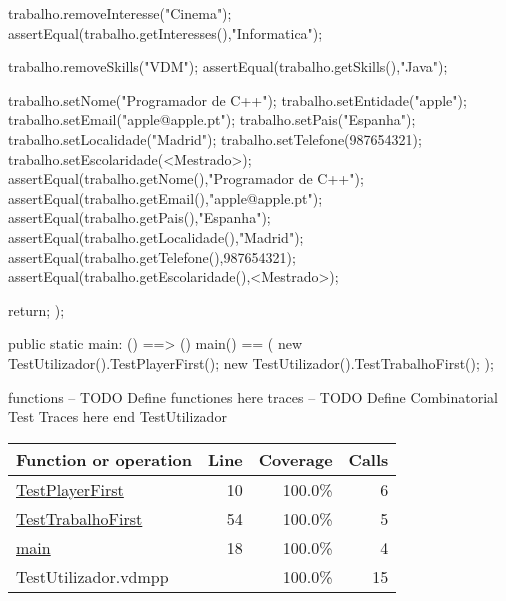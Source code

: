 \begin{vdmpp}[breaklines=true]
 trabalho.removeInteresse("Cinema");
 assertEqual(trabalho.getInteresses(),{"Informatica"});
 
 trabalho.removeSkills("VDM");
 assertEqual(trabalho.getSkills(),{"Java"});
 
 trabalho.setNome("Programador de C++");
 trabalho.setEntidade("apple");
 trabalho.setEmail("apple@apple.pt");
 trabalho.setPais("Espanha");
 trabalho.setLocalidade("Madrid");
 trabalho.setTelefone(987654321);
 trabalho.setEscolaridade(<Mestrado>);
 assertEqual(trabalho.getNome(),"Programador de C++");
 assertEqual(trabalho.getEmail(),"apple@apple.pt");
 assertEqual(trabalho.getPais(),"Espanha");
 assertEqual(trabalho.getLocalidade(),"Madrid");
 assertEqual(trabalho.getTelefone(),987654321);
 assertEqual(trabalho.getEscolaridade(),<Mestrado>);

 return;
);

public static main: () ==> ()
main() ==
(
   new TestUtilizador().TestPlayerFirst();
   new TestUtilizador().TestTrabalhoFirst();
);

functions
-- TODO Define functiones here
traces
-- TODO Define Combinatorial Test Traces here
end TestUtilizador
\end{vdmpp}
\bigskip
\begin{longtable}{|l|r|r|r|}
\hline
Function or operation & Line & Coverage & Calls \\
\hline
\hline
\hyperref[TestPlayerFirst:10]{TestPlayerFirst} & 10&100.0\% & 6 \\
\hline
\hyperref[TestTrabalhoFirst:54]{TestTrabalhoFirst} & 54&100.0\% & 5 \\
\hline
\hyperref[main:18]{main} & 18&100.0\% & 4 \\
\hline
\hline
TestUtilizador.vdmpp & & 100.0\% & 15 \\
\hline
\end{longtable}

